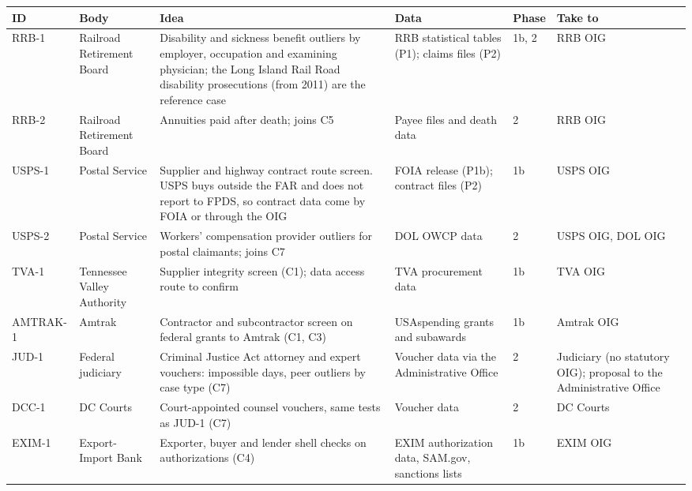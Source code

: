 \documentclass[letterpaper,11pt]{article}
\begin{document}
\begingroup\small\setlength{\tabcolsep}{4pt}\renewcommand{\arraystretch}{1.25}
\begin{longtable}[l]{@{}l>{\raggedright\arraybackslash}p{}>{\raggedright\arraybackslash}p{}>{\raggedright\arraybackslash}p{}l>{\raggedright\arraybackslash}p{}@{}}
\rowcolor{coolblack}\leavevmode\color{white}\bfseries ID & \leavevmode\color{white}\bfseries Body & \leavevmode\color{white}\bfseries Idea & \leavevmode\color{white}\bfseries Data & \leavevmode\color{white}\bfseries Phase & \leavevmode\color{white}\bfseries Take to \\
\endhead
RRB-1 & Railroad Retirement Board & Disability and sickness benefit outliers by employer, occupation and examining physician; the Long Island Rail Road disability prosecutions (from 2011) are the reference case & RRB statistical tables (P1); claims files (P2) & 1b, 2 & RRB OIG \\
RRB-2 & Railroad Retirement Board & Annuities paid after death; joins C5 & Payee files and death data & 2 & RRB OIG \\
USPS-1 & Postal Service & Supplier and highway contract route screen. USPS buys outside the FAR and does not report to FPDS, so contract data come by FOIA or through the OIG & FOIA release (P1b); contract files (P2) & 1b & USPS OIG \\
USPS-2 & Postal Service & Workers' compensation provider outliers for postal claimants; joins C7 & DOL OWCP data & 2 & USPS OIG, DOL OIG \\
TVA-1 & Tennessee Valley Authority & Supplier integrity screen (C1); data access route to confirm & TVA procurement data & 1b & TVA OIG \\
AMTRAK-1 & Amtrak & Contractor and subcontractor screen on federal grants to Amtrak (C1, C3) & USAspending grants and subawards & 1b & Amtrak OIG \\
JUD-1 & Federal judiciary & Criminal Justice Act attorney and expert vouchers: impossible days, peer outliers by case type (C7) & Voucher data via the Administrative Office & 2 & Judiciary (no statutory OIG); proposal to the Administrative Office \\
DCC-1 & DC Courts & Court-appointed counsel vouchers, same tests as JUD-1 (C7) & Voucher data & 2 & DC Courts \\
EXIM-1 & Export-Import Bank & Exporter, buyer and lender shell checks on authorizations (C4) & EXIM authorization data, SAM.gov, sanctions lists & 1b & EXIM OIG \\

\end{longtable}
\end{document}
